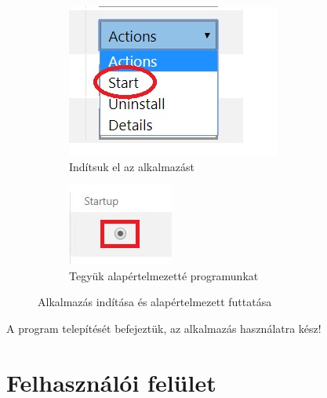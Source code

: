 \documentclass[a4paper,12pt]{report}
\begin{document}
\begin{figure}[h!]
    \centering
    \begin{subfigure}[b]{0.4\linewidth}
        \includegraphics[width=\linewidth]{images/startapp.jpg}
        \caption{Indítsuk el az alkalmazást}
    \end{subfigure}
    \begin{subfigure}[b]{0.4\linewidth}
        \includegraphics[width=\linewidth]{images/startupapp.jpg}
        \caption{Tegyük alapértelmezetté programunkat}
    \end{subfigure}
    \caption{Alkalmazás indítása és alapértelmezett futtatása}
    \label{fig:StartupApp}
\end{figure}

    A program telepítését befejeztük, az alkalmazás használatra kész!

\section{Felhasználói felület}
\end{document}
